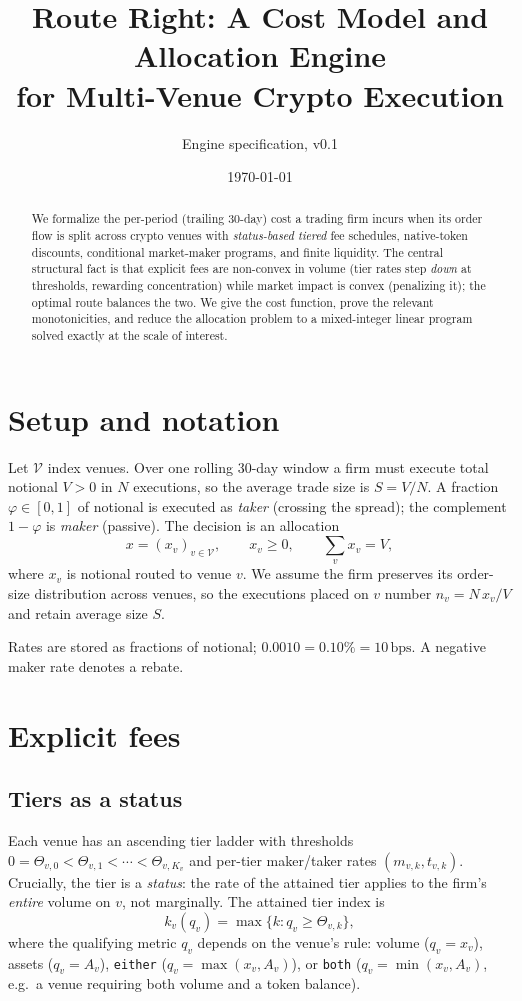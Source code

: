 \documentclass[11pt]{article}
\title{Route Right: A Cost Model and Allocation Engine\\ for Multi-Venue Crypto Execution}
\author{Engine specification, v0.1}
\date{\today}
\newcommand{\bps}{\,\text{bps}}
\begin{document}
\maketitle

\begin{abstract}
We formalize the per-period (trailing 30-day) cost a trading firm incurs when
its order flow is split across crypto venues with \emph{status-based tiered}
fee schedules, native-token discounts, conditional market-maker programs, and
finite liquidity. The central structural fact is that explicit fees are
non-convex in volume (tier rates step \emph{down} at thresholds, rewarding
concentration) while market impact is convex (penalizing it); the optimal route
balances the two. We give the cost function, prove the relevant monotonicities,
and reduce the allocation problem to a mixed-integer linear program solved
exactly at the scale of interest.
\end{abstract}

\section{Setup and notation}
Let $\mathcal V$ index venues. Over one rolling 30-day window a firm must
execute total notional $V>0$ in $N$ executions, so the average trade size is
$S = V/N$. A fraction $\varphi\in[0,1]$ of notional is executed as
\emph{taker} (crossing the spread); the complement $1-\varphi$ is
\emph{maker} (passive). The decision is an allocation
\[
x = (x_v)_{v\in\mathcal V}, \qquad x_v\ge 0, \qquad \sum_{v} x_v = V,
\]
where $x_v$ is notional routed to venue $v$. We assume the firm preserves its
order-size distribution across venues, so the executions placed on $v$ number
$n_v = N\,x_v/V$ and retain average size $S$.

Rates are stored as fractions of notional; $0.0010 = 0.10\% = 10\bps$. A
negative maker rate denotes a rebate.

\section{Explicit fees}
\subsection{Tiers as a status}
Each venue has an ascending tier ladder with thresholds
$0=\Theta_{v,0}<\Theta_{v,1}<\cdots<\Theta_{v,K_v}$ and per-tier maker/taker
rates $(m_{v,k},t_{v,k})$. Crucially, the tier is a \emph{status}: the rate of
the attained tier applies to the firm's \emph{entire} volume on $v$, not
marginally. The attained tier index is
\[
k_v(q_v) = \max\{k : q_v \ge \Theta_{v,k}\},
\]
where the qualifying metric $q_v$ depends on the venue's rule: volume
($q_v=x_v$), assets ($q_v=A_v$), \texttt{either} ($q_v=\max(x_v,A_v)$), or
\texttt{both} ($q_v=\min(x_v,A_v)$, e.g.\ a venue requiring both volume and a
token balance).
\end{document}
